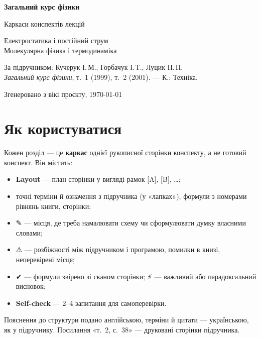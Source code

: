 \documentclass[11pt,a4paper,oneside]{book}
\newcommand{\pen}{{\sffamily\color{accent}✎}}
\newcommand{\warn}{{\sffamily\color{warncol}⚠}}
\newcommand{\ok}{{\sffamily\color{green!45!black}✔}}
\newcommand{\spark}{{\sffamily\color{warncol}⚡}}
\begin{document}
\frontmatter


\begin{titlepage}
\centering\sffamily
\vspace*{40mm}
{\Huge\bfseries\color{accent} Загальний курс фізики\par}
\vspace{6mm}
{\LARGE Каркаси конспектів лекцій\par}
\vspace{12mm}
{\large Електростатика і постійний струм\\[2mm] Молекулярна фізика і термодинаміка\par}
\vfill
{\normalsize За підручником: Кучерук І.\,М., Горбачук І.\,Т., Луцик П.\,П.\\
\textit{Загальний курс фізики}, т.~1 (1999), т.~2 (2001). — К.: Техніка.\par}
\vspace{8mm}
{\small Згенеровано з вікі проєкту, \today\par}
\end{titlepage}

\chapter*{Як користуватися}
Кожен розділ — це \textbf{каркас} однієї рукописної сторінки конспекту, а не готовий конспект. Він містить:
\begin{itemize}
\item \textbf{Layout} — план сторінки у вигляді рамок [A], [B], …;
\item точні терміни й означення з підручника (у «лапках»), формули з номерами рівнянь книги, сторінки;
\item \pen{} — місця, де треба намалювати схему чи сформулювати думку власними словами;
\item \warn{} — розбіжності між підручником і програмою, помилки в книзі, неперевірені місця;
\item \ok{} — формули звірено зі сканом сторінки; \spark{} — важливий або парадоксальний висновок;
\item \textbf{Self-check} — 2–4 запитання для самоперевірки.
\end{itemize}
Пояснення до структури подано англійською, терміни й цитати — українською, як у підручнику. Посилання «т.~2, с.~38» — друковані сторінки підручника.


\tableofcontents
\end{document}
